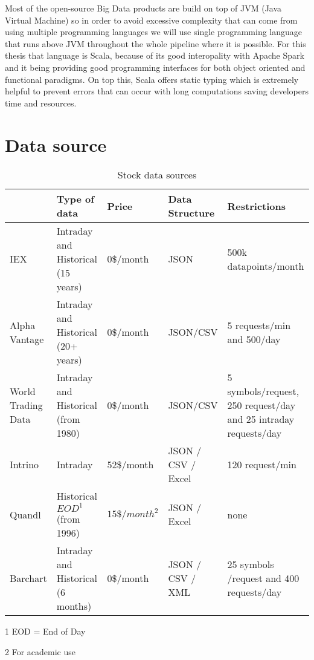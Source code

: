 Most of the open-source Big Data products are build on top of JVM (Java Virtual Machine) so in order to avoid excessive complexity that can come from using multiple programming languages we will use single programming language that runs above JVM throughout the whole pipeline where it is possible.
For this thesis that language is Scala, because of its good interopality with Apache Spark and it being providing good programming interfaces for both object oriented and functional paradigms.
On top this, Scala offers static typing which is extremely helpful to prevent errors that can occur with long computations saving developers time and resources. \cite{scalabook}

\section{Data source}

\begin{table}[! htbp]\centering 
    \caption{Stock data sources}
    \begin{threeparttable}
        \begin{tabular}{|p{2cm}|p{2.5cm}|l|p{2cm}|p{3cm}|} 
        \hline
        & Type of data & Price & Data Structure & Restrictions \\ \hline
        IEX \cite{iex}& Intraday and Historical (15 years) & 0\$/month & JSON & 500k datapoints/month \\ \hline
        Alpha Vantage \cite{alphavantage}  & Intraday and Historical (20+ years)& 0\$/month & JSON/CSV & 5 requests/min and 500/day\\ \hline
        World Trading Data \cite{worldtradingdata} & Intraday and Historical (from 1980) & 0\$/month & JSON/CSV & 5 symbols/request, 250 request/day and 25 intraday requests/day\\ \hline
        Intrino \cite{intrino} & Intraday & 52\$/month & JSON / CSV / Excel & 120 request/min\\ \hline
        Quandl \cite{quandl} & Historical $EOD^1$ (from 1996) & $15\$/month^2$ & JSON / Excel & none\\ \hline
        Barchart \cite{barchart} & Intraday and Historical (6 months) & 0\$/month & JSON / CSV / XML & 25 symbols /request and 400 requests/day\\
        \hline
        \end{tabular}
        \begin{tablenotes}\footnotesize
            \item[1] EOD = End of Day
            \item[2] For academic use 
        \end{tablenotes}
    \end{threeparttable}        
\end{table}

